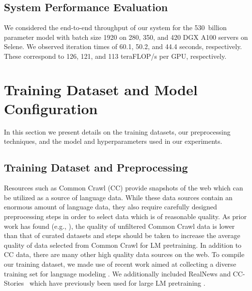 \documentclass[11pt]{article}
\begin{document}
\subsection{System Performance Evaluation}
We considered the end-to-end throughput of our system for the 530~billion parameter model with batch size 1920 on 280, 350, and 420 DGX A100 servers on Selene. We observed iteration times of 60.1, 50.2, and 44.4 seconds, respectively. These correspond to 126, 121, and 113 teraFLOP/s per GPU, respectively.


\section{Training Dataset and Model Configuration}
\label{sec:datamodel}
In this section we present details on the training datasets, our preprocessing techniques, and the model and hyperparameters used in our experiments.

\subsection{Training Dataset and Preprocessing}
Resources such as Common Crawl (CC) provide snapshots of the web which can be utilized as a source of language data. While these data sources contain an enormous amount of language data, they also require carefully designed preprocessing steps in order to select data which is of reasonable quality. As prior work has found (e.g., \citep{brown2020language}), the quality of unfiltered Common Crawl data is lower than that of curated datasets and steps should be taken to increase the average quality of  data selected from Common Crawl for LM pretraining. In addition to CC data, there are many other high quality data sources on the web. To compile our training dataset, we made use of recent work aimed at collecting a diverse training set for language modeling \citep{pile-dataset-2020}. We additionally included RealNews \cite{DBLP:journals/corr/abs-1905-12616} and CC-Stories~\cite{trinh18} which have previously been used for large LM pretraining \cite{tnlg17b,megatron-DBLP:journals/corr/abs-1909-08053}.
\end{document}
